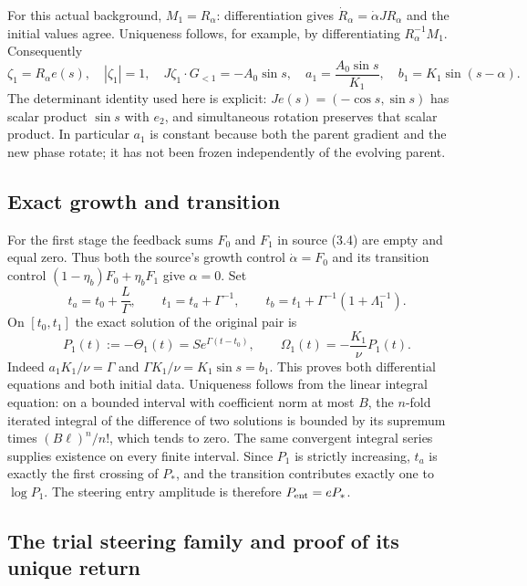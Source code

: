 For this actual background, $M_1=R_\alpha$: differentiation gives
$\dot R_\alpha=\dot\alpha JR_\alpha$ and the initial values agree.
Uniqueness follows, for example, by differentiating
$R_\alpha^{-1}M_1$. Consequently
\begin{equation}
 \zeta_1=R_\alpha e(s),\quad |\zeta_1|=1,\quad
 J\zeta_1\cdot G_{<1}=-A_0\sin s,\quad
 a_1=\frac{A_0\sin s}{K_1},\quad
 b_1=K_1\sin(s-\alpha).
 \label{cvlane:eq:cv-first-exact-coefficients}
\end{equation}
The determinant identity used here is explicit:
$J e(s)=(-\cos s,\sin s)$ has scalar product $\sin s$
with $e_2$, and simultaneous rotation preserves that scalar product.
In particular $a_1$ is constant because both the parent gradient and
the new phase rotate; it has not been frozen independently of the
evolving parent.

\subsection{Exact growth and transition}

For the first stage the feedback sums $F_0$ and $F_1$ in source (3.4)
are empty and equal zero. Thus both the source's growth control
$\dot\alpha=F_0$ and its transition control
$(1-\eta_b)F_0+\eta_bF_1$ give $\alpha=0$.
Set
\[
 t_a=t_0+\frac L\Gamma,\qquad
 t_1=t_a+\Gamma^{-1},\qquad
 t_b=t_1+\Gamma^{-1}(1+\Lambda_1^{-1}).
\]
On $[t_0,t_1]$ the exact solution of the original pair is
\begin{equation}
 P_1(t):=-\Theta_1(t)=S e^{\Gamma(t-t_0)},\qquad
 \Omega_1(t)=-\frac{K_1}{\nu}P_1(t).
 \label{cvlane:eq:cv-first-growth}
\end{equation}
Indeed $a_1K_1/\nu=\Gamma$ and
$\Gamma K_1/\nu=K_1\sin s=b_1$.
This proves both differential equations and both initial data.
Uniqueness follows from the linear integral equation: on a bounded
interval with coefficient norm at most $B$, the $n$-fold iterated
integral of the difference of two solutions is bounded by its supremum
times $(B\ell)^n/n!$, which tends to zero. The same convergent integral
series supplies existence on every finite interval.
Since $P_1$ is strictly increasing, $t_a$ is exactly the first crossing
of $P_*$, and the transition contributes exactly one to $\log P_1$.
The steering entry amplitude is therefore $P_{\rm ent}=eP_*$.

\subsection{The trial steering family and proof of its unique return}

